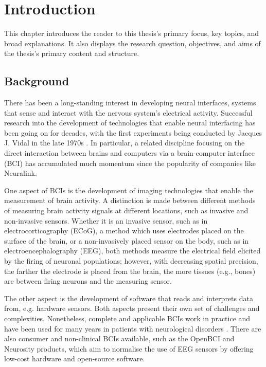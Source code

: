 \chapter{Introduction}
\graphicspath{{Chapter1/Figs/}{Chapter1/Figs/}}

This chapter introduces the reader to this thesis's primary focus, key topics, and broad explanations. It also displays the research question, objectives, and aims of the thesis's primary content and structure.

\section{Background}
\label{chapter1-background}

There has been a long-standing interest in developing neural interfaces, systems that sense and interact with the nervous system's electrical activity. Successful research into the development of technologies that enable neural interfacing has been going on for decades, with the first experiments being conducted by Jacques J. Vidal in the late 1970s \citep{vidal_real-time_1977}. In particular, a related discipline focusing on the direct interaction between brains and computers via a brain-computer interface (BCI) has accumulated much momentum since the popularity of companies like Neuralink.

One aspect of BCIs is the development of imaging technologies that enable the measurement of brain activity. A distinction is made between different methods of measuring brain activity signals at different locations, such as invasive and non-invasive sensors. Whether it is an invasive sensor, such as in electrocorticography (ECoG), a method which uses electrodes placed on the surface of the brain, or a non-invasively placed sensor on the body, such as in electroencephalography (EEG), both methods measure the electrical field elicited by the firing of neuronal populations; however, with decreasing spatial precision, the farther the electrode is placed from the brain, the more tissues (e.g., bones) are between firing neurons and the measuring sensor.

The other aspect is the development of software that reads and interprets data from, e.g. hardware sensors. Both aspects present their own set of challenges and complexities. Nonetheless, complete and applicable BCIs work in practice and have been used for many years in patients with neurological disorders \citep{braingate_publications_nodate}. There are also consumer and non-clinical BCIs available, such as the OpenBCI and Neurosity products, which aim to normalise the use of EEG sensors by offering low-cost hardware and open-source software.

